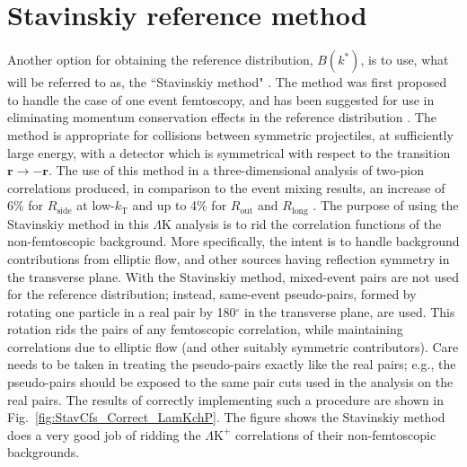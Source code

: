 \documentclass[ALICE,manyauthors]{cernphprep}
\newcommand{\LamK}{$\Lambda$K\xspace}
\newcommand{\LamKchP}{$\Lambda\mathrm{K^{+}}$\xspace}
\begin{document}


\newpage
\appendix
%
\renewcommand{\thesubfigure}{\thefigure(\alph{subfigure})}
\makeatletter
\renewcommand{\p@subfigure}{}
\renewcommand{\@thesubfigure}{(\alph{subfigure})\hskip\subfiglabelskip}
%

\section{Stavinskiy reference method}
\label{App:StavMethod}

Another option for obtaining the reference distribution, $B(k^{*})$, is to use, what will be referred to as, the ``Stavinskiy method" \cite{Stavinskiy04}.
The method was first proposed to handle the case of one event femtoscopy, and has been suggested for use in eliminating momentum conservation effects in the reference distribution \cite{Lisa:2005dd}.
The method is appropriate for collisions between symmetric projectiles, at sufficiently large energy, with a detector which is symmetrical with respect to the transition $\mathbf{r} \rightarrow \mathbf{-r}$.
The use of this method in a three-dimensional analysis of two-pion correlations produced, in comparison to the event mixing results, an increase of 6\% for $R_{\mathrm{side}}$ at low-$k_{\mathrm{T}}$ and up to 4\% for $R_{\mathrm{out}}$ and $R_{\mathrm{long}}$ \cite{Aamodt:2011mr}.
The purpose of using the Stavinskiy method in this \LamK analysis is to rid the correlation functions of the non-femtoscopic background.  
More specifically, the intent is to handle background contributions from elliptic flow, and other sources having reflection symmetry in the transverse plane.  
With the Stavinskiy method, mixed-event pairs are not used for the reference distribution; instead, same-event pseudo-pairs, formed by rotating one particle in a real pair by 180$^\circ$ in the transverse plane, are used.  
This rotation rids the pairs of any femtoscopic correlation, while maintaining correlations due to elliptic flow (and other suitably symmetric contributors).
Care needs to be taken in treating the pseudo-pairs exactly like the real pairs; e.g., the pseudo-pairs should be exposed to the same pair cuts used in the analysis on the real pairs.
The results of correctly implementing such a procedure are shown in Fig.\ \ref{fig:StavCfs_Correct_LamKchP}.  
The figure shows the Stavinskiy method does a very good job of ridding the \LamKchP correlations of their non-femtoscopic backgrounds.  
\end{document}
